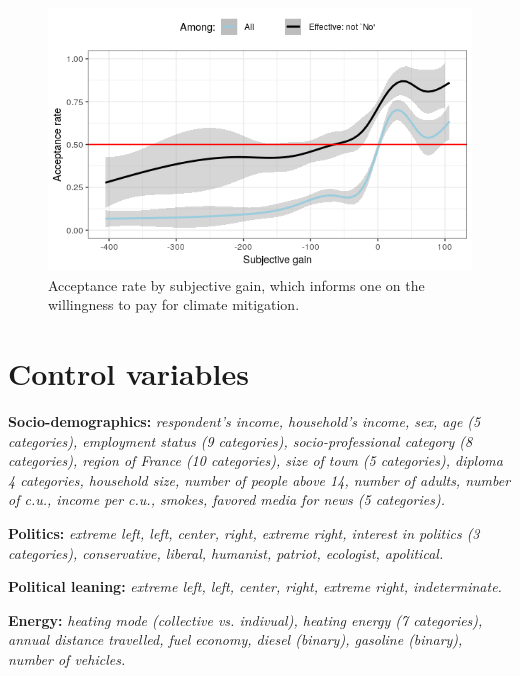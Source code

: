 \documentclass[11pt]{article}
\begin{document}
\begin{appendices}
\begin{figure}[H]
\centering
\includegraphics[width=0.7\columnwidth]{Images/WTP_Both.png}
\caption{Acceptance rate by subjective gain, which informs one on the willingness to pay for climate mitigation.} %
\label{fig:WTP}
\end{figure}



\section{Control variables}\label{set_controls}

\textbf{Socio-demographics:} \textit{respondent's income, household's income, sex, age \textnormal{(5 categories)}, employment status \textnormal{(9 categories)}, socio-professional category \textnormal{(8 categories)}, region of France \textnormal{(10 categories)}, size of town \textnormal{(5 categories)}, diploma \textnormal{4 categories}, household size, number of people above 14, number of adults, number of c.u., income per c.u., smokes, favored media for news \textnormal{(5 categories)}.}

\vspace{0.5cm}

\noindent
\textbf{Politics:} \textit{extreme left, left, center, right, extreme right, interest in politics \textnormal{(3 categories)}, conservative, liberal, humanist, patriot, ecologist, apolitical.}

\vspace{0.5cm}

\noindent
\textbf{Political leaning:} \textit{extreme left, left, center, right, extreme right, indeterminate.}

\vspace{0.5cm}

\noindent
\textbf{Energy:} \textit{heating mode \textnormal{(collective vs. indivual)}, heating energy \textnormal{(7 categories)}, annual distance travelled, fuel economy, diesel \textnormal{(binary)}, gasoline \textnormal{(binary)}, number of vehicles.}


\end{appendices}
\end{document}
